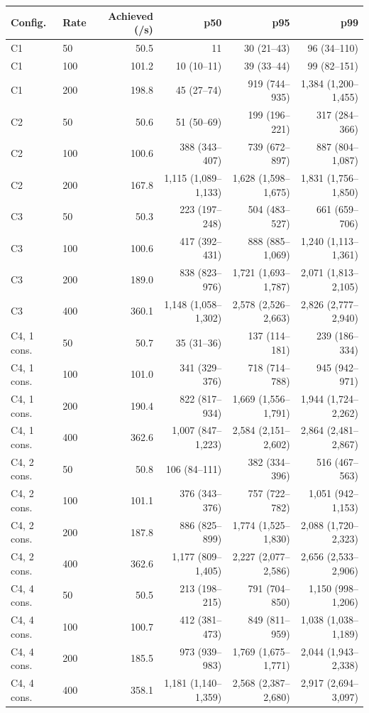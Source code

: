 \begin{tabular}{llrrrr}
\toprule
Config. & Rate & Achieved (/s) & p50 & p95 & p99 \\
\midrule
C1 & 50 & 50.5 & 11 & 30 (21--43) & 96 (34--110) \\
C1 & 100 & 101.2 & 10 (10--11) & 39 (33--44) & 99 (82--151) \\
C1 & 200 & 198.8 & 45 (27--74) & 919 (744--935) & 1,384 (1,200--1,455) \\
\addlinespace[2pt]
C2 & 50 & 50.6 & 51 (50--69) & 199 (196--221) & 317 (284--366) \\
C2 & 100 & 100.6 & 388 (343--407) & 739 (672--897) & 887 (804--1,087) \\
C2 & 200 & 167.8 & 1,115 (1,089--1,133) & 1,628 (1,598--1,675) & 1,831 (1,756--1,850) \\
\addlinespace[2pt]
C3 & 50 & 50.3 & 223 (197--248) & 504 (483--527) & 661 (659--706) \\
C3 & 100 & 100.6 & 417 (392--431) & 888 (885--1,069) & 1,240 (1,113--1,361) \\
C3 & 200 & 189.0 & 838 (823--976) & 1,721 (1,693--1,787) & 2,071 (1,813--2,105) \\
C3 & 400 & 360.1 & 1,148 (1,058--1,302) & 2,578 (2,526--2,663) & 2,826 (2,777--2,940) \\
\addlinespace[2pt]
C4, 1 cons. & 50 & 50.7 & 35 (31--36) & 137 (114--181) & 239 (186--334) \\
C4, 1 cons. & 100 & 101.0 & 341 (329--376) & 718 (714--788) & 945 (942--971) \\
C4, 1 cons. & 200 & 190.4 & 822 (817--934) & 1,669 (1,556--1,791) & 1,944 (1,724--2,262) \\
C4, 1 cons. & 400 & 362.6 & 1,007 (847--1,223) & 2,584 (2,151--2,602) & 2,864 (2,481--2,867) \\
\addlinespace[2pt]
C4, 2 cons. & 50 & 50.8 & 106 (84--111) & 382 (334--396) & 516 (467--563) \\
C4, 2 cons. & 100 & 101.1 & 376 (343--376) & 757 (722--782) & 1,051 (942--1,153) \\
C4, 2 cons. & 200 & 187.8 & 886 (825--899) & 1,774 (1,525--1,830) & 2,088 (1,720--2,323) \\
C4, 2 cons. & 400 & 362.6 & 1,177 (809--1,405) & 2,227 (2,077--2,586) & 2,656 (2,533--2,906) \\
\addlinespace[2pt]
C4, 4 cons. & 50 & 50.5 & 213 (198--215) & 791 (704--850) & 1,150 (998--1,206) \\
C4, 4 cons. & 100 & 100.7 & 412 (381--473) & 849 (811--959) & 1,038 (1,038--1,189) \\
C4, 4 cons. & 200 & 185.5 & 973 (939--983) & 1,769 (1,675--1,771) & 2,044 (1,943--2,338) \\
C4, 4 cons. & 400 & 358.1 & 1,181 (1,140--1,359) & 2,568 (2,387--2,680) & 2,917 (2,694--3,097) \\
\bottomrule
\end{tabular}
